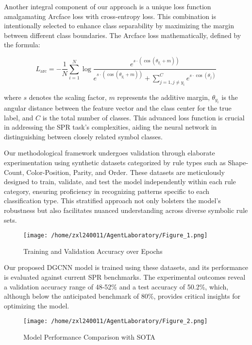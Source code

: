 \documentclass{article}
\begin{document}
Another integral component of our approach is a unique loss function amalgamating Arcface loss with cross-entropy loss. This combination is intentionally selected to enhance class separability by maximizing the margin between different class boundaries. The Arcface loss mathematically, defined by the formula:

\[
L_{\text{arc}} = -\frac{1}{N} \sum_{i=1}^{N} \log \frac{e^{s \cdot (\cos(\theta_{y_i} + m))}}{e^{s \cdot (\cos(\theta_{y_i} + m))} + \sum_{j=1, j \neq y_i}^{C} e^{s \cdot \cos(\theta_j)}}
\]

where \( s \) denotes the scaling factor, \( m \) represents the additive margin, \( \theta_{y_i} \) is the angular distance between the feature vector and the class center for the true label, and \( C \) is the total number of classes. This advanced loss function is crucial in addressing the SPR task's complexities, aiding the neural network in distinguishing between closely related symbol classes.

Our methodological framework undergoes validation through elaborate experimentation using synthetic datasets categorized by rule types such as Shape-Count, Color-Position, Parity, and Order. These datasets are meticulously designed to train, validate, and test the model independently within each rule category, ensuring proficiency in recognizing patterns specific to each classification type. This stratified approach not only bolsters the model's robustness but also facilitates nuanced understanding across diverse symbolic rule sets.

\begin{figure}[h]
\caption{Training and Validation Accuracy over Epochs}
\centering
\texttt{[image: /home/zxl240011/AgentLaboratory/Figure\_1.png]}
\label{fig:fig1}
\end{figure}

Our proposed DGCNN model is trained using these datasets, and its performance is evaluated against current SPR benchmarks. The experimental outcomes reveal a validation accuracy range of 48-52\% and a test accuracy of 50.2\%, which, although below the anticipated benchmark of 80\%, provides critical insights for optimizing the model. 

\begin{figure}[h]
\caption{Model Performance Comparison with SOTA}
\centering
\texttt{[image: /home/zxl240011/AgentLaboratory/Figure\_2.png]}
\label{fig:fig2}
\end{figure}
\end{document}
